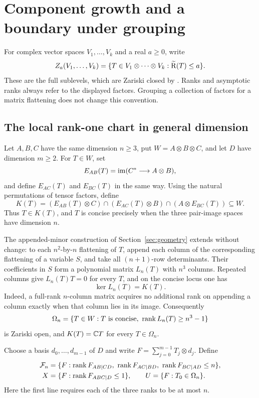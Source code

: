 \section{Component growth and a boundary under grouping}
\label{sec:components}

For complex vector spaces $V_1,\ldots,V_k$ and a real $a\geq0$, write
\[
 Z_a(V_1,\ldots,V_k)
   =\{T\in V_1\otimes\cdots\otimes V_k:\widetilde{\mathrm R}(T)\leq a\}.
\]
These are the full sublevels, which are Zariski closed by
\cite[Theorem~1.2]{CHNVZ2024}. Ranks and asymptotic ranks always refer
to the displayed factors. Grouping a collection of factors for a matrix
flattening does not change this convention.

\subsection{The local rank-one chart in general dimension}
\label{sec:components-chart}

Let $A,B,C$ have the same dimension $n\geq3$, put $W=A\otimes B\otimes C$,
and let $D$ have dimension $m\geq2$. For $T\in W$, set
\[
 E_{AB}(T)=\operatorname{im}(C^*\longrightarrow A\otimes B),
\]
and define $E_{AC}(T)$ and $E_{BC}(T)$ in the same way. Using the
natural permutations of tensor factors, define
\begin{equation}\label{eq:components-K}
 K(T)=(E_{AB}(T)\otimes C)\cap(E_{AC}(T)\otimes B)
                    \cap(A\otimes E_{BC}(T))\subseteq W.
\end{equation}
Thus $T\in K(T)$, and $T$ is concise precisely when the three
pair-image spaces have dimension $n$.

The appended-minor construction of Section~\ref{sec:geometry} extends
without change: to each $n^2$-by-$n$ flattening of $T$, append each
column of the corresponding flattening of a variable $S$, and take
all $(n+1)$-row determinants. Their coefficients in $S$ form a
polynomial matrix $L_n(T)$ with $n^3$ columns. Repeated columns give
$L_n(T)T=0$ for every $T$, and on the concise locus one has
\[
 \ker L_n(T)=K(T).
\]
Indeed, a full-rank $n$-column matrix acquires no additional rank
on appending a column exactly when that column lies in its image.
Consequently
\begin{equation}\label{eq:components-Omega}
 \Omega_n=\{T\in W:T\text{ is concise},\ \operatorname{rank} L_n(T)\geq n^3-1\}
\end{equation}
is Zariski open, and $K(T)=\mathbb C T$ for every $T\in\Omega_n$.

Choose a basis $d_0,\ldots,d_{m-1}$ of $D$ and write
$F=\sum_{j=0}^{m-1}T_j\otimes d_j$. Define
\[
 \begin{split}
 \mathcal F_n={}&\{F:\operatorname{rank} F_{AB\mid CD},\ \operatorname{rank} F_{AC\mid BD},
                          \ \operatorname{rank} F_{BC\mid AD}\leq n\},\\
 X={}&\{F:\operatorname{rank} F_{ABC\mid D}\leq1\},\qquad
 U=\{F:T_0\in\Omega_n\}.
 \end{split}
\]
Here the first line requires each of the three ranks to be at most $n$.

